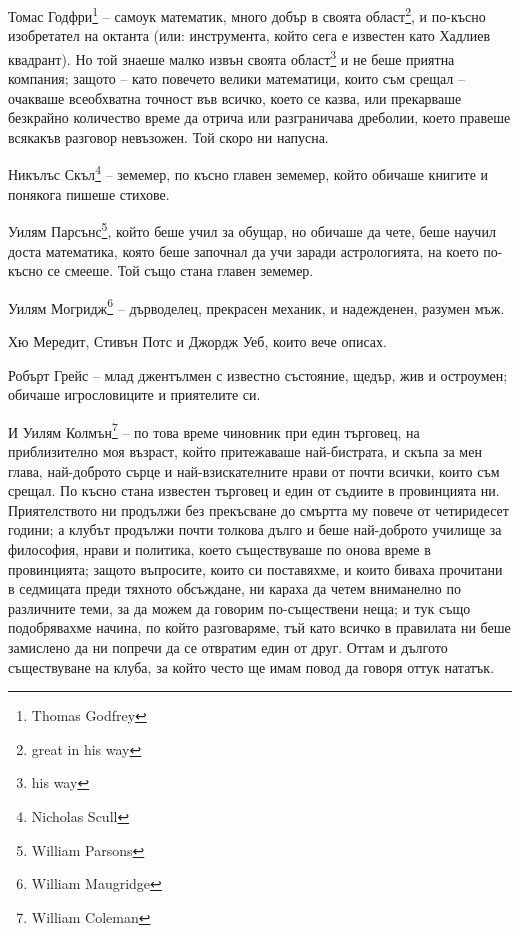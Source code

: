 \documentclass[12pt]{book}
\begin{document}
Томас Годфри\footnote{Thomas Godfrey} – самоук математик, много добър в своята област\footnote{great in his way}, и по-късно изобретател на октанта (или: инструмента, който сега е известен като Хадлиев квадрант). Но той знаеше малко извън своята област\footnote{his way} и не беше приятна компания; защото – като повечето велики математици, които съм срещал – очакваше всеобхватна точност във всичко, което се казва, или прекарваше безкрайно количество време да отрича или разграничава дреболии, което правеше всякакъв разговор невъзожен. Той скоро ни напусна.

Никълъс Скъл\footnote{Nicholas Scull} – земемер, по късно главен земемер, който обичаше книгите и понякога пишеше стихове.

Уилям Парсънс\footnote{William Parsons}, който беше учил за обущар, но обичаше да чете, беше научил доста математика, която беше започнал да учи заради астрологията, на което по-късно се смееше. Той също стана главен земемер.

Уилям Могридж\footnote{William Maugridge} – дърводелец, прекрасен механик, и надежденен, разумен мъж.

Хю Мередит, Стивън Потс и Джордж Уеб, които вече описах.

Робърт Грейс – млад джентълмен с известно състояние, щедър, жив и остроумен; обичаше игрословиците и приятелите си.

И Уилям Колмън\footnote{William Coleman} – по това време чиновник при един търговец, на приблизително моя възраст, който притежаваше най-бистрата, и скъпа за мен глава, най-доброто сърце и най-взискателните нрави от почти всички, които съм срещал. По късно стана известен търговец и един от съдиите в провинцията ни. Приятелството ни продължи без прекъсване до смъртта му повече от четиридесет години; а клубът продължи почти толкова дълго и беше най-доброто училище за философия, нрави и политика, което съществуваше по онова време в провинцията; защото въпросите, които си поставяхме, и които биваха прочитани в седмицата преди тяхното обсъждане, ни караха да четем вниманелно по различните теми, за да можем да говорим по-съществени неща; и тук също подобрявахме начина, по който разговаряме, тъй като всичко в правилата ни беше замислено да ни попречи да се отвратим един от друг. Оттам и дългото съществуване на клуба, за който често ще имам повод да говоря оттук нататък.
\end{document}
